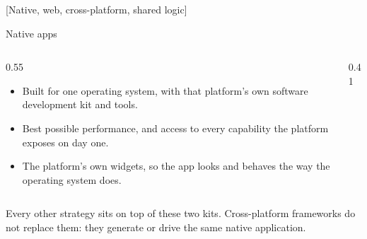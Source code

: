 \documentclass[10pt,aspectratio=169,t]{beamer}
\begin{document}
[Native, web, cross-platform, shared logic]

\begin{frame}[eyebrow=Strategies]{Native apps}
  \vskip 2mm
  \begin{columns}[T]
    \begin{column}{0.55\textwidth}
      \begin{itemize}
        \item Built for one operating system, with that platform's own software development kit and tools.
        \item Best possible performance, and access to every capability the platform exposes on day one.
        \item The platform's own widgets, so the app looks and behaves the way the operating system does.
      \end{itemize}
    \end{column}
    \begin{column}{0.41\textwidth}
      \vskip 3mm
    \end{column}
  \end{columns}
  \begin{takeaway}{Every other strategy sits on top of these two kits.}
    Cross-platform frameworks do not replace them: they generate or drive the same native application.
  \end{takeaway}
\end{frame}
\end{document}
